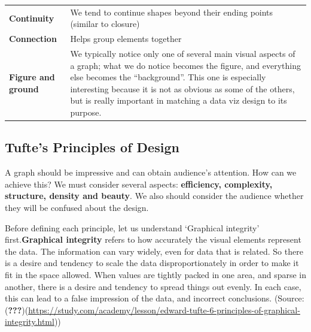 \documentclass[]{book}
\begin{document}
\begin{longtable}[]{@{}ll@{}}
\begin{minipage}[t]{0.15\columnwidth}
\textbf{Continuity}\strut
\end{minipage} & \begin{minipage}[t]{0.79\columnwidth}\raggedright
We tend to continue shapes beyond their ending points (similar to closure)\strut
\end{minipage}\tabularnewline
\begin{minipage}[t]{0.15\columnwidth}\raggedright
\textbf{Connection}\strut
\end{minipage} & \begin{minipage}[t]{0.79\columnwidth}\raggedright
Helps group elements together\strut
\end{minipage}\tabularnewline
\begin{minipage}[t]{0.15\columnwidth}\raggedright
\textbf{Figure and ground}\strut
\end{minipage} & \begin{minipage}[t]{0.79\columnwidth}\raggedright
We typically notice only one of several main visual aspects of a graph; what we do notice becomes the figure, and everything else becomes the ``background''. This one is especially interesting because it is not as obvious as some of the others, but is really important in matching a data viz design to its purpose.\strut
\end{minipage}\tabularnewline
\bottomrule
\end{longtable}

\hypertarget{tuftes-principles-of-design}{%
\subsection{Tufte's Principles of Design}\label{tuftes-principles-of-design}}

A graph should be impressive and can obtain audience's attention. How can we achieve this? We must consider several aspects: \textbf{efficiency, complexity, structure, density and beauty}. We also should consider the audience whether they will be confused about the design.

Before defining each principle, let us understand `Graphical integrity' first.\textbf{Graphical integrity} refers to how accurately the visual elements represent the data. The information can vary widely, even for data that is related. So there is a desire and tendency to scale the data disproportionately in order to make it fit in the space allowed. When values are tightly packed in one area, and sparse in another, there is a desire and tendency to spread things out evenly. In each case, this can lead to a false impression of the data, and incorrect conclusions.
(Source:({\textbf{???}})(\url{https://study.com/academy/lesson/edward-tufte-6-principles-of-graphical-integrity.html}))
\end{document}
